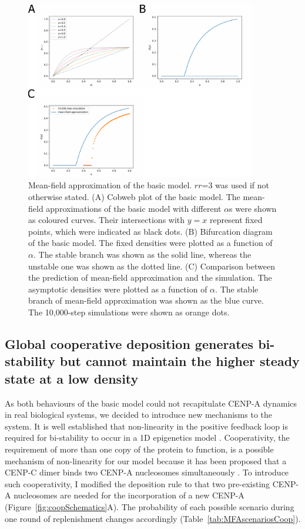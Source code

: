 \begin{figure}[htbp]
  \centering
  \includegraphics[width=0.9\textwidth]{chapter2/figures/mean-field_approximation.pdf}
  \caption[Mean-field approximation of the basic model]{Mean-field approximation of the basic model. $rr$=3 was used if not otherwise stated. (A) Cobweb plot of the basic model. The mean-field approximations of the basic model with different $\alpha$s were shown as coloured curves. Their intersections with $y = x$ represent fixed points, which were indicated as black dots. (B) Bifurcation diagram of the basic model. The fixed densities were plotted as a function of $\alpha$. The stable branch was shown as the solid line, whereas the unstable one was shown as the dotted line. (C) Comparison between the prediction of mean-field approximation and the simulation. The asymptotic densities were plotted as a function of $\alpha$. The stable branch of mean-field approximation was shown as the blue curve. The 10,000-step simulations were shown as orange dots.}
  \label{fig:meanFieldApproximation}
\end{figure}


\subsection{Global cooperative deposition generates bi-stability but cannot maintain the higher steady state at a low density}

As both behaviours of the basic model could not recapitulate CENP-A dynamics in real biological systems, we decided to introduce new mechanisms to the system. It is well established that non-linearity in the positive feedback loop is required for bi-stability to occur in a 1D epigenetics model \citep{Dodd2007, Micheelsen2010TheoryLandscapes, Dodd2017}. Cooperativity, the requirement of more than one copy of the protein to function, is a possible mechanism of non-linearity for our model because it has been proposed that a CENP-C dimer binds two CENP-A nucleosomes simultaneously \citep{Walstein2021}. To introduce such cooperativity, I modified the deposition rule to that two pre-existing CENP-A nucleosomes are needed for the incorporation of a new CENP-A (Figure~\ref{fig:coopSchematics}A). The probability of each possible scenario during one round of replenishment changes accordingly (Table~\ref{tab:MFAscenariosCoop}). 

